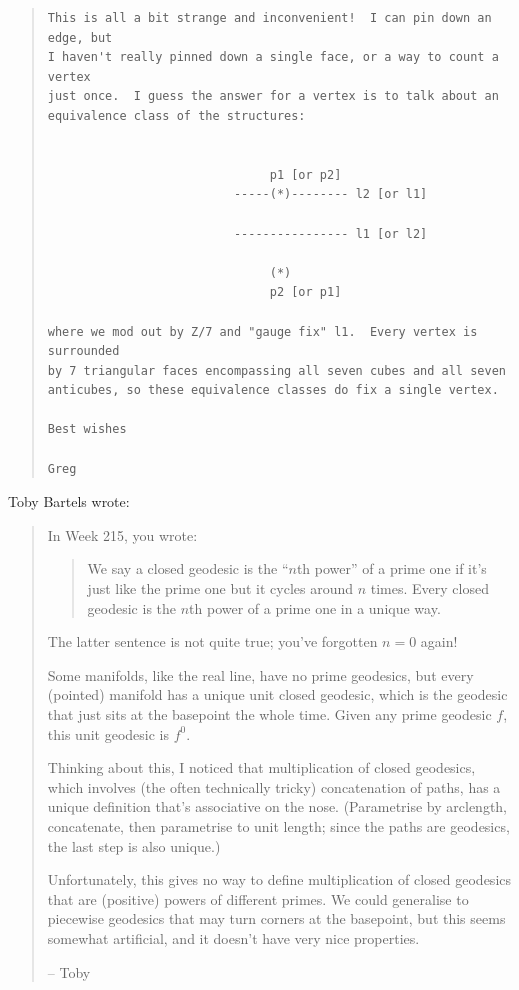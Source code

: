 \documentclass{article}
\begin{document}
\begin{quote}
\begin{verbatim}
This is all a bit strange and inconvenient!  I can pin down an edge, but 
I haven't really pinned down a single face, or a way to count a vertex 
just once.  I guess the answer for a vertex is to talk about an 
equivalence class of the structures:


                               p1 [or p2]
                          -----(*)-------- l2 [or l1]

                          ---------------- l1 [or l2]

                               (*)
                               p2 [or p1]

where we mod out by Z/7 and "gauge fix" l1.  Every vertex is surrounded 
by 7 triangular faces encompassing all seven cubes and all seven 
anticubes, so these equivalence classes do fix a single vertex.

Best wishes

Greg
\end{verbatim}
\end{quote}

Toby Bartels wrote:

\begin{quote}
In Week 215, you wrote:

\begin{quote}
We say a closed geodesic is the ``\(n\)th power'' of a prime one if it's
just like the prime one but it cycles around \(n\) times. Every closed
geodesic is the \(n\)th power of a prime one in a unique way.
\end{quote}

The latter sentence is not quite true; you've forgotten \(n = 0\) again!

Some manifolds, like the real line, have no prime geodesics, but every
(pointed) manifold has a unique unit closed geodesic, which is the
geodesic that just sits at the basepoint the whole time. Given any prime
geodesic \(f\), this unit geodesic is \(f^0\).

Thinking about this, I noticed that multiplication of closed geodesics,
which involves (the often technically tricky) concatenation of paths,
has a unique definition that's associative on the nose. (Parametrise by
arclength, concatenate, then parametrise to unit length; since the paths
are geodesics, the last step is also unique.)

Unfortunately, this gives no way to define multiplication of closed
geodesics that are (positive) powers of different primes. We could
generalise to piecewise geodesics that may turn corners at the
basepoint, but this seems somewhat artificial, and it doesn't have very
nice properties.

-- Toby
\end{quote}
\end{document}
